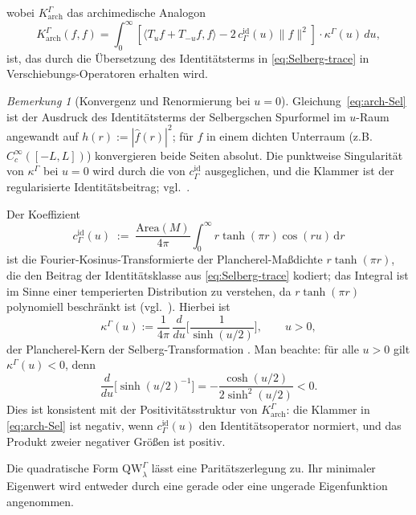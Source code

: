 \documentclass[12pt,a4paper]{article}
\theoremstyle{definition}
\theoremstyle{remark}
\newtheorem{remark}[theorem]{Bemerkung}
\newcommand{\QW}{\mathrm{QW}}
\begin{document}
wobei $K_\mathrm{arch}^\Gamma$ das archimedische Analogon
\begin{equation}
\label{eq:arch-Sel}
K_\mathrm{arch}^\Gamma(f,f) = \int_0^\infty[\langle T_u f + T_{-u}f, f\rangle - 2\,c_\Gamma^{\mathrm{id}}(u)\|f\|^2]\cdot \kappa^\Gamma(u)\,du,
\end{equation}
ist, das durch die Übersetzung des Identitätsterms in \eqref{eq:Selberg-trace} in
Verschiebungs-Operatoren erhalten wird.
\begin{remark}[Konvergenz und Renormierung bei $u=0$]
\label{rem:arch-renorm}
Gleichung~\eqref{eq:arch-Sel} ist der Ausdruck des Identitätsterms der
Selbergschen Spurformel im $u$-Raum angewandt auf $h(r) := |\hat f(r)|^2$; für
$f$ in einem dichten Unterraum (z.B.\ $C_c^\infty([-L,L])$) konvergieren
beide Seiten absolut.  Die punktweise Singularität von $\kappa^\Gamma$ bei $u=0$
wird durch die von $c_\Gamma^{\mathrm{id}}$ ausgeglichen, und die Klammer ist der
regularisierte Identitätsbeitrag; vgl.\ \cite[Kap.~6]{Hejhal1976}.
\end{remark}
Der Koeffizient
\begin{equation}
\label{eq:cGamma-def}
c_\Gamma^{\mathrm{id}}(u) \;:=\; \frac{\mathrm{Area}(M)}{4\pi}
\int_0^\infty r\tanh(\pi r)\cos(ru)\,\mathrm{d}r
\end{equation}
ist die Fourier-Kosinus-Transformierte der Plancherel-Maßdichte
$r\tanh(\pi r)$, die den Beitrag der Identitätsklasse aus
\eqref{eq:Selberg-trace} kodiert; das Integral ist im Sinne einer temperierten Distribution zu
verstehen, da $r\tanh(\pi r)$ polynomiell
beschränkt ist (vgl.\ \cite[Kap.~6]{Hejhal1976}).  Hierbei ist
\begin{equation}
\label{eq:kappa-Sel}
\kappa^\Gamma(u) := \frac{1}{4\pi}\,\frac{d}{du}\!\Big[\frac{1}{\sinh(u/2)}\Big],\qquad u > 0,
\end{equation}
der Plancherel-Kern der Selberg-Transformation \cite[Gl.~(1.40)]{Iwaniec2002}.
Man beachte: für alle $u > 0$ gilt $\kappa^\Gamma(u) < 0$, denn
\[
\frac{d}{du}\bigl[\sinh(u/2)^{-1}\bigr]
= -\frac{\cosh(u/2)}{2\sinh^2(u/2)} < 0.
\]
Dies ist konsistent mit der Positivitätsstruktur von $K_\mathrm{arch}^\Gamma$:
die Klammer in \eqref{eq:arch-Sel} ist negativ, wenn $c_\Gamma^{\mathrm{id}}(u)$ den
Identitätsoperator normiert, und das Produkt zweier negativer Größen ist positiv.

Die quadratische Form $\QW^\Gamma_\lambda$ lässt eine Paritätszerlegung zu. Ihr
minimaler Eigenwert wird entweder durch eine gerade oder eine ungerade Eigenfunktion angenommen.
\end{document}
